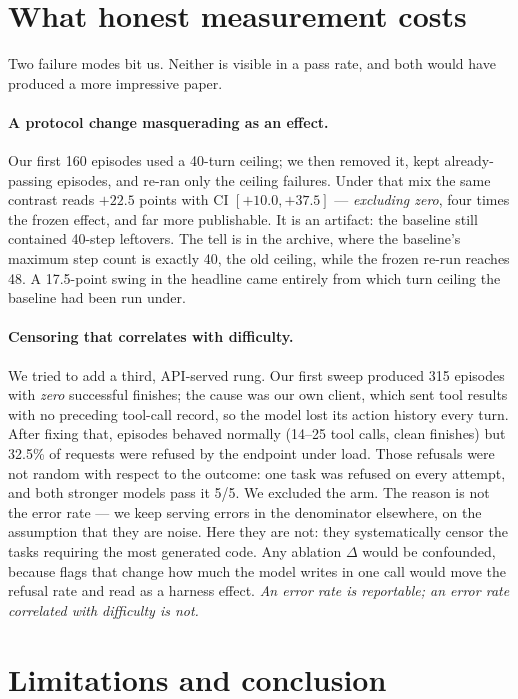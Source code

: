 \documentclass[10pt]{article}
\begin{document}
\section{What honest measurement costs}
\label{sec:cost}

Two failure modes bit us. Neither is visible in a pass rate, and both would have produced a
more impressive paper.

\paragraph{A protocol change masquerading as an effect.}
Our first 160 episodes used a 40-turn ceiling; we then removed it, kept already-passing
episodes, and re-ran only the ceiling failures. Under that mix the same contrast reads
$+22.5$ points with CI $[+10.0, +37.5]$ --- \emph{excluding zero}, four times the frozen effect,
and far more publishable. It is an artifact: the baseline still contained 40-step leftovers.
The tell is in the archive, where the baseline's maximum step count is exactly 40, the old
ceiling, while the frozen re-run reaches 48. A 17.5-point swing in the headline came entirely
from which turn ceiling the baseline had been run under.

\paragraph{Censoring that correlates with difficulty.}
We tried to add a third, API-served rung. Our first sweep produced 315 episodes with
\emph{zero} successful finishes; the cause was our own client, which sent tool results with no
preceding tool-call record, so the model lost its action history every turn. After fixing that,
episodes behaved normally (14--25 tool calls, clean finishes) but 32.5\% of requests were
refused by the endpoint under load. Those refusals were not random with respect to the outcome:
one task was refused on every attempt, and both stronger models pass it 5/5. We excluded the
arm. The reason is not the error rate --- we keep serving errors in the denominator elsewhere,
on the assumption that they are noise. Here they are not: they systematically censor the tasks
requiring the most generated code. Any ablation $\Delta$ would be confounded, because flags that
change how much the model writes in one call would move the refusal rate and read as a harness
effect. \emph{An error rate is reportable; an error rate correlated with difficulty is not.}

\section{Limitations and conclusion}
\end{document}
